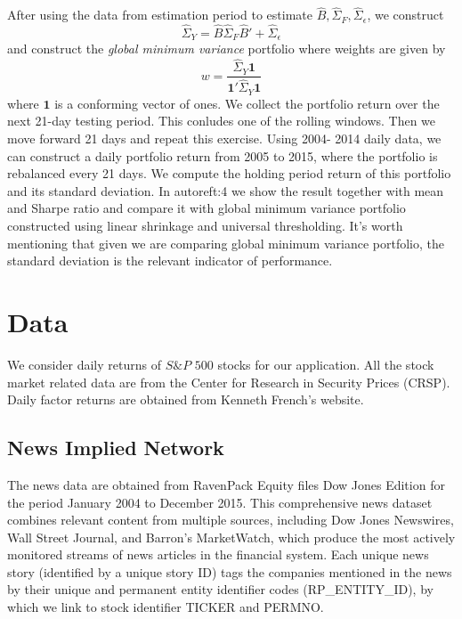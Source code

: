 After using the data from estimation period to estimate \(\hat{B} ,\hat{\Sigma}_{F}, \hat{\Sigma}_{\epsilon}\), we construct 
\begin{equation*}
    \hat{\Sigma}_{Y} = \hat{B} \hat{\Sigma}_{F} \hat{B}' + \hat{\Sigma}_{\epsilon} 
\end{equation*}
and construct the \textit{global minimum variance} portfolio where weights are given by 
\begin{equation*}
    w = \frac{\hat{\Sigma}_{Y} \mathbf{1}}{\mathbf{1}' \hat{\Sigma}_{Y} \mathbf{1}}
\end{equation*}
where \(\mathbf{1}\) is a conforming vector of ones. We collect the portfolio return over the next 21-day testing period. This conludes one of the rolling windows. Then we move forward 21 days and repeat this exercise. Using 2004- 2014 daily data, we can construct a daily portfolio return from 2005 to 2015, where the portfolio is rebalanced every 21 days. We compute the holding period return of this portfolio and its standard deviation. In autoref{t:4} we show the result together with mean and Sharpe ratio and compare it with global minimum variance portfolio constructed using linear shrinkage and universal thresholding. It's worth mentioning that given we are comparing global minimum variance portfolio, the standard deviation is the relevant indicator of performance.  



\section{Data}
We consider daily returns of $S\& P$ $500$ stocks for our application. All the stock market related data are from the Center for Research in Security Prices (CRSP). Daily factor returns are obtained from Kenneth French’s website.
\subsection{News Implied Network}
The news data are obtained from RavenPack Equity files Dow Jones Edition for the period January 2004 to December 2015. This comprehensive news dataset combines relevant content from multiple sources, including Dow Jones Newswires, Wall Street Journal, and Barron's MarketWatch, which produce the most actively monitored streams of news articles in the financial system. Each unique news story (identified by a unique story ID) tags the companies mentioned in the news by their unique and permanent entity identifier codes (RP\_ENTITY\_ID),  by which we link to stock identifier TICKER and PERMNO.


